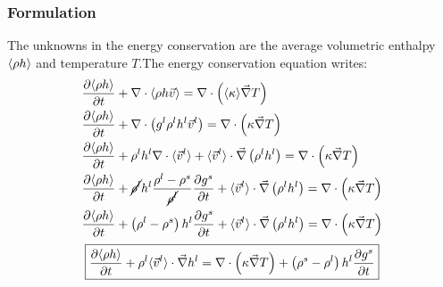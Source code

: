 \subsubsection{Formulation}
The unknowns in the energy conservation are the average volumetric enthalpy $\langle \rho h \rangle$ and temperature $T$.The energy conservation equation writes:
\begin{subequations}
\begin{align}
	& \frac{\partial \langle \rho h \rangle}{\partial t} + \nabla \cdot \langle \rho h \vec{v} \rangle 
	= \nabla  \cdot \left( \langle \kappa \rangle \vec{\nabla} T  \right) \\
	& \frac{\partial \langle \rho h \rangle}{\partial t} + \nabla \cdot \left( {g^l} \rho^l h^l \vec{v}^l \right)
	= \nabla  \cdot \left( \kappa \vec{\nabla} T  \right) \\ 
	& \frac{\partial \langle \rho h \rangle}{\partial t} 
		+ \rho^l h^l  \nabla \cdot \langle \vec{v}^l \rangle
		+ \langle \vec{v}^l \rangle \cdot \vec{\nabla} \left( \rho^l h^l \right)
		= \nabla  \cdot \left( \kappa \vec{\nabla} T  \right) \\   
	& \frac{\partial \langle \rho h \rangle}{\partial t} 
		+ \cancel{\rho^l} h^l  \frac{\rho^l-\rho^s}{\cancel{\rho^l}} \frac{\partial  {g^s} }{\partial t}
		+ \langle \vec{v}^l \rangle \cdot \vec{\nabla} \left( \rho^l h^l \right)
		= \nabla  \cdot \left( \kappa \vec{\nabla} T  \right) \\ 
	& \frac{\partial \langle \rho h \rangle}{\partial t} 
		+ \left( \rho^l-\rho^s \right) h^l \frac{\partial  {g^s} }{\partial t}
		+ \langle \vec{v}^l \rangle \cdot \vec{\nabla} \left( \rho^l h^l \right)
		= \nabla  \cdot \left( \kappa \vec{\nabla} T  \right)        
\end{align}
\end{subequations}
\begin{align}
\label{eq:energy_balance}
 \boxed{ \frac{\partial \langle \rho h \rangle}{\partial t} 
		+ \rho^l \langle \vec{v}^l \rangle \cdot \vec{\nabla} h^l
		= \nabla  \cdot \left( \kappa \vec{\nabla} T  \right)
		+ \left( \rho^s-\rho^l \right) h^l \frac{\partial  {g^s}}{\partial t}}
\end{align}

